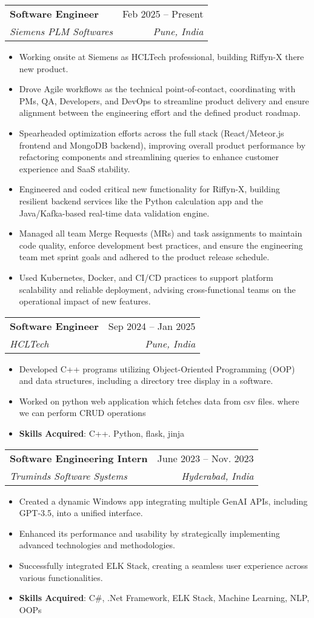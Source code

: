 \documentclass[letterpaper,11pt]{article}
\makeatletter
\newcommand{\resumeItem}[1]{
  \item\small{
    {#1 \vspace{-2pt}}
  }
}
\newcommand{\resumeSubheading}[4]{
  \vspace{-2pt}\item
    \begin{tabular*}{0.97\textwidth}[t]{l@{\extracolsep{\fill}}r}
      \textbf{#1} & #2 \\
      \textit{\small#3} & \textit{\small #4} \\
    \end{tabular*}\vspace{-7pt}
}
\newcommand{\resumeItemListStart}{\begin{itemize}}
\newcommand{\resumeItemListEnd}{\end{itemize}\vspace{-5pt}}
\makeatother
\begin{document}
  \resumeSubheading
  {Software Engineer}{Feb 2025 -- Present}
  {Siemens PLM Softwares}{Pune, India}
  \resumeItemListStart
        \resumeItem{Working onsite at Siemens as HCLTech professional, building Riffyn-X there new product.  }
        \resumeItem{Drove Agile workflows as the technical point-of-contact, coordinating with PMs, QA, Developers, and DevOps to streamline product delivery and ensure alignment between the engineering effort and the defined product roadmap.}
        \resumeItem{Spearheaded optimization efforts across the full stack (React/Meteor.js frontend and MongoDB backend), improving overall product performance by refactoring components and streamlining queries to enhance customer experience and SaaS stability.}
        \resumeItem{Engineered and coded critical new functionality for Riffyn-X, building resilient backend services like the Python calculation app and the Java/Kafka-based real-time data validation engine.}
        \resumeItem{Managed all team Merge Requests (MRs) and task assignments to maintain code quality, enforce development best practices, and ensure the engineering team met sprint goals and adhered to the product release schedule.}
        \resumeItem{Used Kubernetes, Docker, and CI/CD practices to support platform scalability and reliable deployment, advising cross-functional teams on the operational impact of new features.}
  \resumeItemListEnd

    \resumeSubheading
      {Software Engineer}{Sep 2024 -- Jan 2025}
      {HCLTech}{Pune, India}
      \resumeItemListStart
        \resumeItem{Developed C++ programs utilizing Object-Oriented Programming (OOP) and data structures, including a directory tree display in a software.}
        \resumeItem{Worked on python web application which fetches data from csv files. where we can perform CRUD operations}
        \resumeItem{\textbf{Skills Acquired}: C++. Python, flask, jinja}
      \resumeItemListEnd
  
    \resumeSubheading
      {Software Engineering Intern}{June 2023 -- Nov. 2023}
      {Truminds Software Systems}{Hyderabad, India}
      \resumeItemListStart
        \resumeItem{Created a dynamic Windows app integrating multiple GenAI APIs, including GPT-3.5, into a unified interface.}
        \resumeItem{Enhanced its performance and usability by strategically implementing advanced technologies and methodologies.}
        \resumeItem{Successfully integrated ELK Stack, creating a seamless user experience across various functionalities.}
        \resumeItem{\textbf{Skills Acquired}: C\#, .Net Framework, ELK Stack, Machine Learning, NLP, OOPs}
    \resumeItemListEnd
\end{document}
